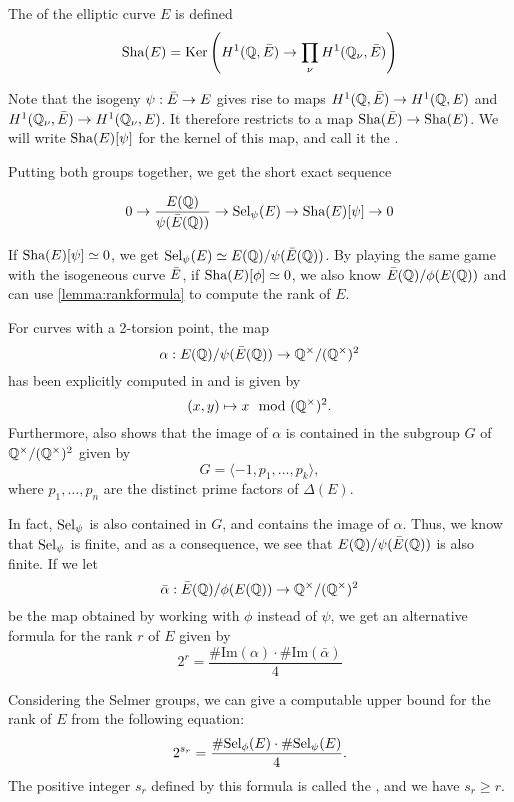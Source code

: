 \documentclass[12pt, a4paper]{report}
\begin{document}
\begin{defn} \label{defn:sha}
  The  of the elliptic curve $E$ is defined
  $$ \text{\normalfont Sha}(E) = \text{Ker} 
  \left(H^1({\mathbb Q}, \bar{E}) \rightarrow \prod\limits_\nu H^1 ({\mathbb Q}_\nu,
  \bar{E})\right) $$
\end{defn}
Note that the isogeny $\psi: \bar{E} \rightarrow E$ gives rise to maps $H^1({\mathbb Q},
\bar{E}) \rightarrow H^1({\mathbb Q},E)$ and $H^1({\mathbb Q}_\nu, \bar{E}) \rightarrow H^1({\mathbb Q}_\nu, E)$. It
therefore restricts to a map $\text{\normalfont Sha}(\bar{E}) \rightarrow \text{\normalfont Sha}(E)$. We will write
$\text{\normalfont Sha}(E)[\psi]$ for the kernel of this map, and call it the
.

Putting both groups together, we get the short exact sequence

\[ 0 \rightarrow \frac{E({\mathbb Q})}{\psi(\bar{E}({\mathbb Q}))} \rightarrow \text{\normalfont Sel}_\psi(E) \rightarrow \text{\normalfont Sha}(E)[\psi]
  \rightarrow 0\]

If $\text{\normalfont Sha}(E)[\psi] \simeq 0$, we get
$\text{\normalfont Sel}_\psi(E) \simeq E({\mathbb Q})/\psi(\bar{E}({\mathbb Q}))$. By playing
the same game with the isogeneous curve $\bar{E}$, if $\text{\normalfont Sha}(E)[\phi] \simeq 0$,
we also know $\bar{E}({\mathbb Q})/\phi(E({\mathbb Q}))$ and can use \ref{lemma:rankformula} to compute
the rank of $E$. 

For curves with a 2-torsion point, the map 
$$\alpha : E({\mathbb Q}) / \psi(\bar{E}({\mathbb Q})) \rightarrow {\mathbb Q}^\times / ({\mathbb Q}^\times)^2$$ has been
explicitly computed in \cite[Page 91]{rational} and
is given by
$$(x,y) \mapsto x \mod ({\mathbb Q}^\times)^2.$$
Furthermore, \cite[Pages 85-87]{rational} also shows that the image of $\alpha$ is
contained in the subgroup $G$ of ${\mathbb Q}^\times / ({\mathbb Q}^\times)^2$ given by 
\[G = \langle -1, p_1, \dots, p_k  \rangle,\]
where $p_1, \dots, p_n$ are the distinct prime factors of $\Delta(E).$

In fact, $\text{\normalfont Sel}_\psi$ is also contained in $G$, and contains the image of $\alpha$. Thus,
we know that $\text{\normalfont Sel}_\psi$ is finite, and as a consequence, we see that
$E({\mathbb Q})/\psi(\bar{E}({\mathbb Q}))$ is also finite. If we let $$\bar{\alpha} :
\bar{E}({\mathbb Q}) / \phi (E({\mathbb Q})) \rightarrow {\mathbb Q}^\times / ({\mathbb Q}^\times)^2$$ be the map
obtained by working with $\phi$ instead of $\psi$, we get an alternative
formula for the rank $r$ of $E$ given by
\[2^r = \frac{\# \text{Im}(\alpha) \cdot \# \text{Im}(\bar{\alpha})}{4}\]

Considering the Selmer groups, we can give a computable upper bound for the rank
of $E$ from the following equation:
\[2^{s_r} = \frac{\# \text{\normalfont Sel}_\phi(E) \cdot \# \text{\normalfont Sel}_\psi(E)}{4}.\]
The positive integer $s_r$ defined by this formula 
is called the , and we have $s_r \geq r.$
\end{document}
